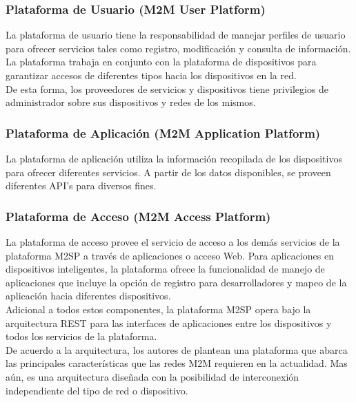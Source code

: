 \documentclass[journal]{IEEEtran}
\begin{document}
\subsubsection{Plataforma de Usuario (M2M User Platform)}

La plataforma de usuario tiene la responsabilidad de manejar perfiles de usuario para ofrecer servicios tales como registro, modificación y consulta de información. La plataforma trabaja en conjunto con la plataforma de dispositivos para garantizar accesos de diferentes tipos hacia los dispositivos en la red.\\
De esta forma, los proveedores de servicios y dispositivos tiene privilegios de administrador sobre sus dispositivos y redes de los mismos.\\

\subsubsection{Plataforma de Aplicación (M2M Application Platform)}

La plataforma de aplicación utiliza la información recopilada de los dispositivos para ofrecer diferentes servicios. A partir de los datos disponibles, se proveen diferentes API's para diversos fines.\\

\subsubsection{Plataforma de Acceso (M2M Access Platform)}

La plataforma de acceso provee el servicio de acceso a los demás servicios de la plataforma M2SP a través de aplicaciones o acceso Web. Para aplicaciones en dispositivos inteligentes, la plataforma ofrece la funcionalidad de manejo de aplicaciones que incluye la opción de registro para desarrolladores y mapeo de la aplicación hacia diferentes dispositivos.\\

Adicional a todos estos componentes, la plataforma M2SP opera bajo la arquitectura REST para las interfaces de aplicaciones entre los dispositivos y todos los servicios de la plataforma.\\

De acuerdo a la arquitectura, los autores de \cite{paper1} plantean una plataforma que abarca las principales características que las redes M2M requieren en la actualidad. Mas aún, es una arquitectura diseñada con la posibilidad de interconexión independiente del tipo de red o dispositivo.
\end{document}
